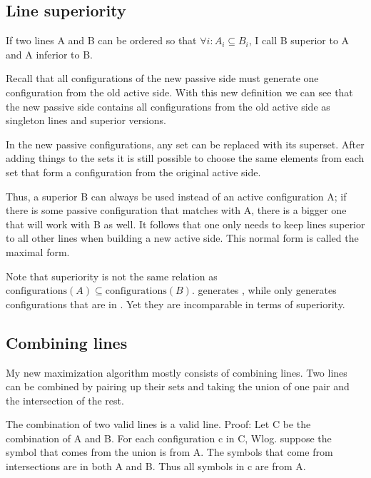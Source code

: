 \documentclass[english, 12pt, a4paper, sci, utf8, a-1b, online]{aaltothesis}
\begin{document}
\subsection{Line superiority}

If two lines A and B can be ordered so that $\forall i : A_i \subseteq B_i$, I call B superior to A and A inferior to B.

Recall that all configurations of the new passive side must generate one configuration from the old active side. With this new definition we can see that the new passive side contains all configurations from the old active side as singleton lines and superior versions.

In the new passive configurations, any set can be replaced with its superset. After adding things to the sets it is still possible to choose the same elements from each set that form a configuration from the original active side.

Thus, a superior B can always be used instead of an active configuration A; if there is some passive configuration that matches with A, there is a bigger one that will work with B as well. It follows that one only needs to keep lines superior to all other lines when building a new active side. This normal form is called the maximal form.

Note that superiority is not the same relation as $\text{configurations}(A) \subseteq \text{configurations}(B)$.  generates , while  only generates configurations that are in . Yet they are incomparable in terms of superiority.


\subsection{Combining lines}

My new maximization algorithm mostly consists of combining lines. Two lines can be combined by pairing up their sets and taking the union of one pair and the intersection of the rest.

The combination of two valid lines is a valid line. Proof: Let C be the combination of A and B. For each configuration c in C, Wlog. suppose the symbol that comes from the union is from A. The symbols that come from intersections are in both A and B. Thus all symbols in c are from A.
\end{document}
